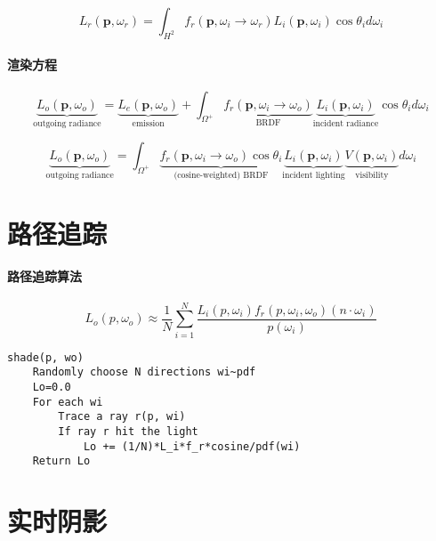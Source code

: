 \documentclass[]{ctexart}
\begin{document}
\begin{equation}
    L_r(\mathbf{p},\omega_r) = \int_{H^2} f_r(\mathbf{p},\omega_i\rightarrow\omega_r)L_i(\mathbf{p},\omega_i)\cos\theta_i d\omega_i
\end{equation}

\paragraph{渲染方程}

\begin{equation}
    \underbrace{L_o(\mathbf{p},\omega_o)}_{\text{outgoing radiance}}= \underbrace{L_e(\mathbf{p},\omega_o)}_{\text{emission}} + \int_{\Omega^+}\underbrace{f_r(\mathbf{p},\omega_i\rightarrow\omega_o)}_{\text{BRDF}}\underbrace{L_i(\mathbf{p},\omega_i)}_{\text{incident radiance}}\cos\theta_i d\omega_i
\end{equation}

\begin{equation}
    \underbrace{L_o(\mathbf{p},\omega_o)}_{\text{outgoing radiance}}=\int_{\Omega^+}\underbrace{f_r(\mathbf{p},\omega_i\rightarrow\omega_o)\cos\theta_i}_{\text{(cosine-weighted) BRDF}}\underbrace{L_i(\mathbf{p},\omega_i)}_{\text{incident lighting}} \underbrace{V(\mathbf{p},\omega_i)}_{\text{visibility}} d\omega_i \label{eq:rtr}
\end{equation}


\section{路径追踪}
\paragraph{路径追踪算法}

\begin{equation}
    L_o(p,\omega_o)\approx\frac{1}{N}\sum_{i=1}^N\frac{L_i(p,\omega_i)f_r(p,\omega_i,\omega_o)(n\cdot\omega_i)}{p(\omega_i)}
\end{equation}

\begin{verbatim}
shade(p, wo)
    Randomly choose N directions wi~pdf
    Lo=0.0
    For each wi
        Trace a ray r(p, wi)
        If ray r hit the light
            Lo += (1/N)*L_i*f_r*cosine/pdf(wi)
    Return Lo
\end{verbatim}

\section{实时阴影}
\end{document}
